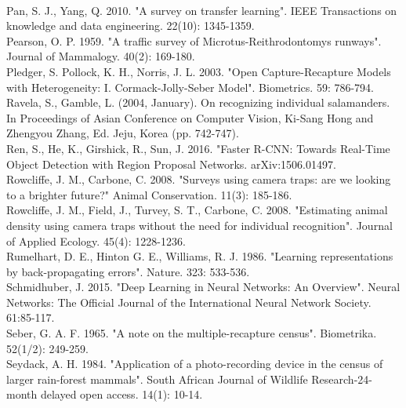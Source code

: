 \documentclass[11pt]{article}
\begin{document}
\newline
\\
Pan, S. J., Yang, Q. 2010. "A survey on transfer learning". IEEE Transactions on knowledge and data engineering. 22(10): 1345-1359.
\newline
\\
Pearson, O. P. 1959. "A traffic survey of Microtus-Reithrodontomys runways". Journal of Mammalogy. 40(2): 169-180.
\newline
\\
Pledger, S. Pollock, K. H., Norris, J. L. 2003. "Open Capture-Recapture Models with Heterogeneity: I. Cormack-Jolly-Seber Model". Biometrics. 59: 786-794.
\newline
\\
Ravela, S., Gamble, L. (2004, January). On recognizing individual salamanders. In Proceedings of Asian Conference on Computer Vision, Ki-Sang Hong and Zhengyou Zhang, Ed. Jeju, Korea (pp. 742-747).
\newline
\\
Ren, S., He, K., Girshick, R., Sun, J. 2016. "Faster R-CNN: Towards Real-Time Object Detection with Region Proposal Networks. arXiv:1506.01497.
\newline
\\
Rowcliffe, J. M., Carbone, C. 2008. "Surveys using camera traps: are we looking to a brighter future?" Animal Conservation. 11(3): 185-186.
\newline
\\
Rowcliffe, J. M., Field, J., Turvey, S. T., Carbone, C. 2008. "Estimating animal density using camera traps without the need for individual recognition". Journal of Applied Ecology. 45(4): 1228-1236.
\newline
\\
Rumelhart, D. E., Hinton G. E., Williams, R. J. 1986. "Learning representations by back-propagating errors". Nature. 323: 533-536.
\newline
\\
Schmidhuber, J. 2015. "Deep Learning in Neural Networks: An Overview". Neural Networks: The Official Journal of the International Neural Network Society. 61:85-117.
\newline
\\
Seber, G. A. F. 1965. "A note on the multiple-recapture census". Biometrika. 52(1/2): 249-259.
\newline
\\
Seydack, A. H. 1984. "Application of a photo-recording device in the census of larger rain-forest mammals". South African Journal of Wildlife Research-24-month delayed open access. 14(1): 10-14.
\end{document}
